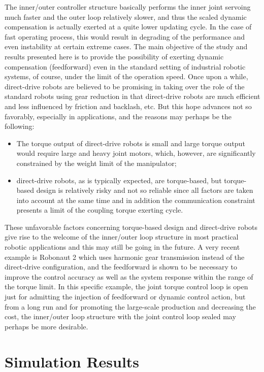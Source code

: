 \documentclass[9pt,technote]{IEEEtran}
\begin{document}
{The inner/outer controller structure basically performs the inner joint servoing much faster and the outer loop relatively slower, and thus the scaled dynamic compensation is actually exerted at a quite lower updating cycle. In the case of fast operating process, this would result in degrading of the performance and even instability at certain extreme cases. The main objective of the study and results presented here is to provide the possibility of exerting dynamic compensation (feedforward) even in the standard setting of industrial robotic systems, of course, under the limit of the operation speed. Once upon a while, direct-drive robots are believed to be promising in taking over the role of the standard robots using gear reduction in that direct-drive robots are much efficient and less influenced by friction and backlash, etc. But this hope advances not so favorably, especially in applications, and the reasons may perhaps be the following:
\begin{itemize}
\item The torque output of direct-drive robots is small and large torque output would require large and heavy joint motors, which, however, are significantly constrained by the weight limit of the manipulator;
\item direct-drive robots, as is typically expected, are torque-based, but torque-based design is relatively risky and not so reliable since all factors are taken into account at the same time and in addition the communication constraint presents a limit of the coupling torque exerting cycle.
\end{itemize}
These unfavorable factors concerning torque-based design and direct-drive robots give rise to the welcome of the inner/outer loop structure in most practical robotic applications and this may still be going in the future. A very recent example is Robonaut 2 \cite{Ahlstrom2013_robonaut} which uses harmonic gear transmission instead of the direct-drive configuration, and the feedforward is shown to be necessary to improve the control accuracy as well as the system response within the range of the torque limit. In this specific example, the joint torque control loop is open just for admitting the injection of feedforward or dynamic control action, but from a long run and for promoting the large-scale production and decreasing the cost, the inner/outer loop structure with the joint control loop sealed may perhaps be more desirable.


\section{Simulation Results}

}
\end{document}
